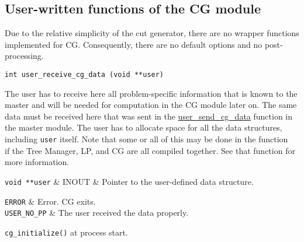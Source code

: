\subsection{User-written functions of the CG module}

Due to the relative simplicity of the cut generator, there are no wrapper
functions implemented for CG. Consequently, there are no default
options and no post-processing.

\bd

\label{user_receive_cg_data}
\begin{verbatim}
int user_receive_cg_data (void **user)
\end{verbatim}

\bd

\describe

The user has to receive here all problem-specific information that is
known to the master and will be needed for computation in the CG
module later on. The same data must be received here that was sent in
the \hyperref{{\tt user\_send\_cg\_data()}}{{\tt
user\_send\_cg\_data()} (see Section }{)}{user_send_cg_data} function
in the master module. The user has to allocate space for all the data
structures, including {\tt user} itself. Note that some or all of this
may be done in the function {\tt 
{}} if the Tree Manager, LP,
and CG are all compiled together. See that function for more
information.

\args

{\tt void **user} & INOUT & Pointer to the user-defined data structure. \\
\et

\returns

{\tt ERROR} & Error. CG exits. \\
{\tt USER\_NO\_PP} & The user received the data properly. \\
\et

\item[Invoked from:] {\tt cg\_initialize()} at process start.

\ed

\vspace{1ex}

